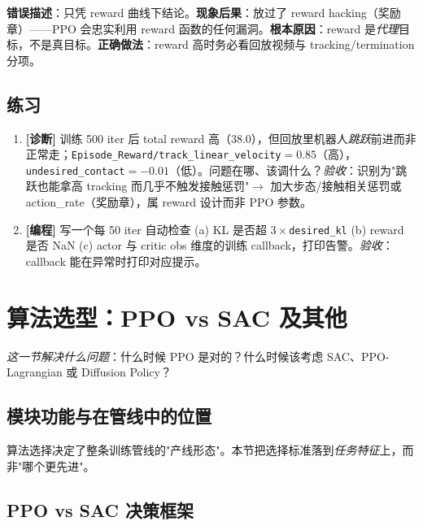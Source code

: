 \begin{pitfall}
\textbf{错误描述}：只凭 reward 曲线下结论。\textbf{现象后果}：放过了 reward hacking（奖励章）——PPO 会忠实利用 reward 函数的任何漏洞。\textbf{根本原因}：reward 是\emph{代理}目标，不是真目标。\textbf{正确做法}：reward 高时务必看回放视频与 tracking/termination 分项。
\end{pitfall}

\subsection{练习}

\begin{practice}[诊断与监控]
\begin{enumerate}
  \item \textbf{[诊断]} 训练 500 iter 后 total reward 高（$38.0$），但回放里机器人\emph{跳跃}前进而非正常走；\verb|Episode_Reward/track_linear_velocity|$=0.85$（高），\verb|undesired_contact|$=-0.01$（低）。问题在哪、该调什么？\emph{验收}：识别为"跳跃也能拿高 tracking 而几乎不触发接触惩罚"$\to$ 加大步态/接触相关惩罚或 action\_rate（奖励章），属 reward 设计而非 PPO 参数。
  \item \textbf{[编程]} 写一个每 50 iter 自动检查 (a) KL 是否超 $3\times$\verb|desired_kl| (b) reward 是否 NaN (c) actor 与 critic obs 维度的训练 callback，打印告警。\emph{验收}：callback 能在异常时打印对应提示。
\end{enumerate}
\end{practice}

\section{算法选型：PPO vs SAC 及其他}
\label{sec:rlmc-train-ppo-sac}

\emph{这一节解决什么问题}：什么时候 PPO 是对的？什么时候该考虑 SAC、PPO-Lagrangian 或 Diffusion Policy？

\subsection{模块功能与在管线中的位置}

算法选择决定了整条训练管线的"产线形态"。本节把选择标准落到\emph{任务特征}上，而非"哪个更先进"。

\subsection{PPO vs SAC 决策框架}

